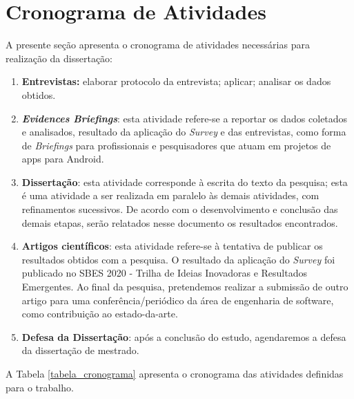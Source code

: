 \section{Cronograma de Atividades}

A presente seção apresenta o cronograma de atividades necessárias para realização da dissertação:

\begin{enumerate}[label=\bf AT\arabic*,leftmargin=1.7cm]

    \item \textbf{Entrevistas:} elaborar protocolo da entrevista; aplicar; analisar os dados obtidos.
    
    \item \textbf {\textit{Evidences Briefings}}: esta atividade refere-se a reportar os dados coletados e analisados, resultado da aplicação do \textit{Survey} e das entrevistas, como forma de \textit{Briefings} para profissionais e pesquisadores que atuam em projetos de apps para Android. 
    
    \item \textbf{Dissertação}: esta atividade corresponde à escrita do texto da pesquisa; esta é uma atividade a ser realizada em paralelo às demais atividades, com refinamentos sucessivos. De acordo com o desenvolvimento e conclusão das demais etapas, serão relatados nesse documento os resultados encontrados.
    
    \item \textbf{Artigos científicos}: esta atividade refere-se à tentativa de publicar os resultados obtidos com a pesquisa. O resultado da aplicação do \textit{Survey} foi publicado no SBES 2020 - Trilha de Ideias Inovadoras e Resultados Emergentes. Ao final da pesquisa, pretendemos realizar a submissão de outro artigo para uma conferência/periódico da área de engenharia de software, como contribuição ao estado-da-arte.
    
    \item \textbf{Defesa da Dissertação}: após a conclusão do estudo, agendaremos a defesa da dissertação de mestrado. 

\end{enumerate}

A Tabela \ref{tabela_cronograma} apresenta o cronograma das atividades definidas para o trabalho.

